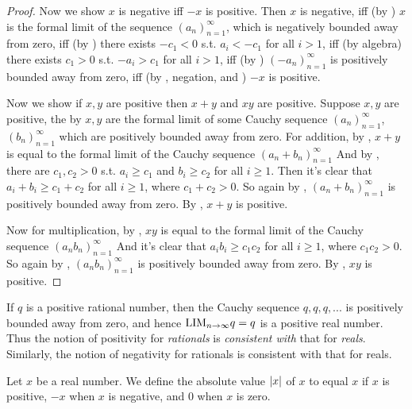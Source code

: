 \begin{proof}
Now we show \(x\) is negative iff \(-x\) is positive.
Then \(x\) is negative, iff (by ) \(x\) is the formal limit of the sequence \((a_n)_{n = 1}^{\infty}\), which is negatively bounded away from zero, iff (by ) there exists \(-c_1 < 0\) s.t. \(a_i < -c_1\) for all \(i > 1\), iff (by algebra) there exists \(c_1 > 0\) s.t. \(-a_i > c_1\) for all \(i > 1\), iff (by ) \((-a_n)_{n = 1}^{\infty}\) is positively bounded away from zero, iff (by , negation, and ) \(-x\) is positive.

Now we show if \(x, y\) are positive then \(x + y\) and \(xy\) are positive.
Suppose \(x, y\) are positive, the by  \(x, y\) are the formal limit of some Cauchy sequence \((a_n)_{n = 1}^{\infty}\), \((b_n)_{n = 1}^{\infty}\) which are positively bounded away from zero.
For addition, by , \(x + y\) is equal to the formal limit of the Cauchy sequence \((a_n + b_n)_{n = 1}^{\infty}\)
And by , there are \(c_1, c_2 > 0\) s.t. \(a_i \ge c_1\) and \(b_i \ge c_2\) for all \(i \ge 1\).
Then it's clear that \(a_i + b_i \ge c_1 + c_2\) for all \(i \ge 1\), where \(c_1 + c_2 > 0\).
So again by , \((a_n + b_n)_{n = 1}^{\infty}\) is positively bounded away from zero.
By , \(x + y\) is positive.

Now for multiplication, by , \(xy\) is equal to the formal limit of the Cauchy sequence \((a_n b_n)_{n = 1}^{\infty}\)
And it's clear that \(a_i b_i \ge c_1 c_2\) for all \(i \ge 1\), where \(c_1 c_2 > 0\).
So again by , \((a_n b_n)_{n = 1}^{\infty}\) is positively bounded away from zero.
By , \(xy\) is positive.
\end{proof}

\begin{note}
If \(q\) is a positive rational number, then the Cauchy sequence \(q, q, q, ...\) is positively bounded away from zero, and hence \(\text{LIM}_{n \to \infty} q = q\) is a positive real number.
Thus the notion of positivity for \emph{rationals} is \emph{consistent with} that for \emph{reals}.
Similarly, the notion of negativity for rationals is consistent with that for reals.
\end{note}

\begin{definition}  \label{def 5.4.5}
Let \(x\) be a real number.
We define the absolute value \(\lvert x\rvert\) of \(x\) to equal \(x\) if \(x\) is positive, \(-x\) when \(x\) is negative, and \(0\) when \(x\) is zero.
\end{definition}

